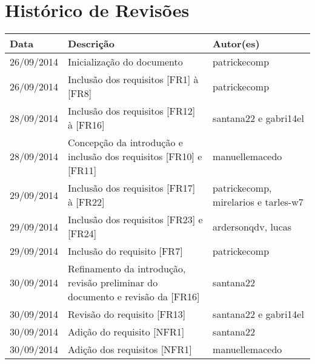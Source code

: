 \documentclass{article}
\begin{document}
\capa

\newpage
	
	\section*{\center Histórico de Revisões}
	  \vspace*{1cm}
	  \begin{table}[ht]
	    \centering
	    \begin{tabular}[pos]{|m{2cm} | m{7.2cm} | m{3.8cm}|} 
	      \hline
	      \cellcolor[gray]{0.9}
	      \textbf{Data} & \cellcolor[gray]{0.9}\textbf{Descrição} & \cellcolor[gray]{0.9}\textbf{Autor(es)}\\ \hline
	      \hline
	      \small 26/09/2014 & \small Inicialização do documento & \small patrickecomp \\ \hline      
	      \small 26/09/2014 & \small Inclusão dos requisitos [FR1] à [FR8] & \small patrickecomp \\ \hline 
	      \small 28/09/2014 & \small Inclusão dos requisitos [FR12] à [FR16] & \small santana22 e gabri14el \\ \hline
	      \small 28/09/2014 & \small Concepção da introdução e inclusão dos requisitos [FR10] e [FR11] & \small manuellemacedo \\ \hline 
	      \small 29/09/2014 & \small Inclusão dos requisitos [FR17] à [FR22] & \small patrickecomp, mirelarios e tarles-w7 \\ \hline    
	      \small 29/09/2014 & \small Inclusão dos requisitos [FR23] e [FR24] & \small ardersonqdv, lucas \\ \hline   
	      \small 29/09/2014 & \small Inclusão do requisito [FR7] & \small patrickecomp \\ \hline 
	      \small 30/09/2014 & \small Refinamento da introdução,  revisão preliminar do documento e revisão da [FR16] & \small santana22 \\ \hline
	      \small 30/09/2014 & \small Revisão do requisito [FR13] & \small santana22 e gabri14el \\ \hline
	      \small 30/09/2014 & \small Adição do requisito [NFR1] & \small santana22 \\ \hline
	      \small 30/09/2014 & \small Adição dos requisitos [NFR1] & \small manuellemacedo \\ \hline
	    \end{tabular}
	  \end{table}
	
\end{document}

